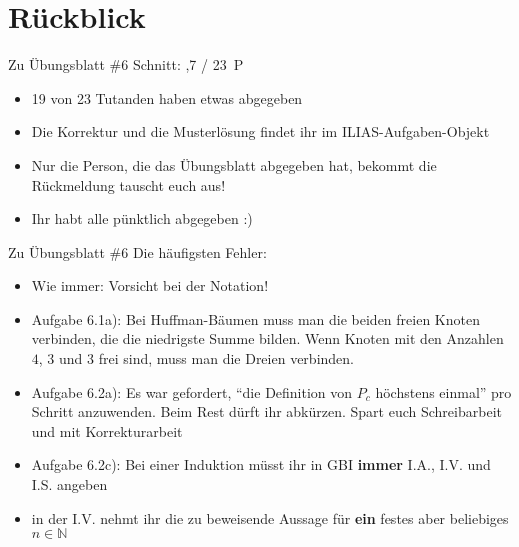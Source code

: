 
\newcommand{\handout}{}



\morescalingdelimiters




\section{Rückblick}

\begin{frame}{Zu Übungsblatt \#6}
	Schnitt: ,7 / 23~P

	\begin{itemize}[<+->]
		\item 19 von 23 Tutanden haben etwas abgegeben
		\item Die Korrektur und die Musterlösung findet ihr im ILIAS-Aufgaben-Objekt
		\item Nur die Person, die das Übungsblatt abgegeben hat, bekommt die Rückmeldung \impl tauscht euch aus!
		\item Ihr habt alle pünktlich abgegeben :)
	\end{itemize}
\end{frame}

\begin{frame}{Zu Übungsblatt \#6}
	Die häufigsten Fehler:
	\begin{itemize}[<+->]
		\item Wie immer: Vorsicht bei der Notation!
		\item Aufgabe 6.1a): Bei Huffman-Bäumen muss man die beiden freien Knoten verbinden, die die niedrigste Summe bilden.
		\implitem Wenn Knoten mit den Anzahlen $4$, $3$ und $3$ frei sind, muss man die Dreien verbinden.
		\item Aufgabe 6.2a): Es war gefordert, ``die Definition von $P_c$ höchstens einmal'' pro Schritt anzuwenden. Beim Rest dürft ihr abkürzen.
		\implitem Spart euch Schreibarbeit und mit Korrekturarbeit \smiley
		\item Aufgabe 6.2c): Bei einer Induktion müsst ihr in GBI \textbf{immer} I.A., I.V. und I.S. angeben
		\item[] in der I.V. nehmt ihr die zu beweisende Aussage für \textbf{ein} festes aber beliebiges $n \in \mathbb{N}$
	\end{itemize}
\end{frame}

